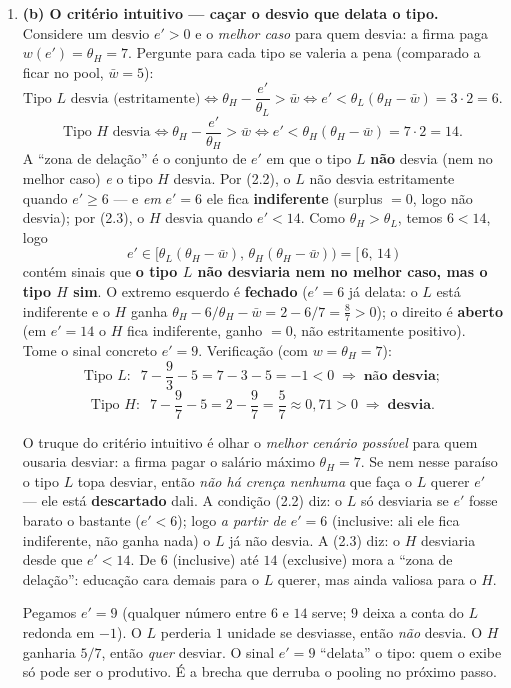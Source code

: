 \documentclass[11pt,a4paper]{article}
\newcommand{\dc}[2]{#1{,}#2}
\begin{document}
\begin{enumerate}[leftmargin=2em,itemsep=4pt]
\item \textbf{(b) O critério intuitivo — caçar o desvio que delata o tipo.} Considere um
desvio $e'>0$ e o \emph{melhor caso} para quem desvia: a firma paga $w(e')=\theta_H=7$. Pergunte
para cada tipo se valeria a pena (comparado a ficar no pool, $\bar w=5$):
\[
\text{Tipo }L\text{ desvia (estritamente)} \iff \theta_H-\frac{e'}{\theta_L}>\bar w
\iff e' < \theta_L(\theta_H-\bar w) = 3\cdot 2 = 6. \tag{2.2}
\]
\[
\text{Tipo }H\text{ desvia} \iff \theta_H-\frac{e'}{\theta_H}>\bar w
\iff e' < \theta_H(\theta_H-\bar w) = 7\cdot 2 = 14. \tag{2.3}
\]
A ``zona de delação'' é o conjunto de $e'$ em que o tipo $L$ \textbf{não} desvia (nem no
melhor caso) \emph{e} o tipo $H$ desvia. Por (2.2), o $L$ não desvia estritamente quando
$e'\ge 6$ — e \emph{em} $e'=6$ ele fica \textbf{indiferente} (surplus $=0$, logo não desvia);
por (2.3), o $H$ desvia quando $e'<14$. Como $\theta_H>\theta_L$, temos $6<14$, logo
\[
\boxed{\;e'\in\big[\theta_L(\theta_H-\bar w),\,\theta_H(\theta_H-\bar w)\big)=[\,6,\,14\,)\;} \tag{2.4}
\]
contém sinais que \textbf{o tipo $L$ não desviaria nem no melhor caso, mas o tipo $H$ sim}.
O extremo esquerdo é \textbf{fechado} ($e'=6$ já delata: o $L$ está indiferente e o $H$ ganha
$\theta_H-6/\theta_H-\bar w=2-6/7=\tfrac{8}{7}>0$); o direito é \textbf{aberto} (em $e'=14$ o
$H$ fica indiferente, ganho $=0$, não estritamente positivo).
Tome o sinal concreto $\boxed{e'=9}$. Verificação (com $w=\theta_H=7$):
\[
\text{Tipo }L: \;\; 7-\frac{9}{3}-5 = 7-3-5 = -1 < 0 \;\Rightarrow\; \textbf{não desvia};
\]
\[
\text{Tipo }H: \;\; 7-\frac{9}{7}-5 = 2-\frac{9}{7} = \frac{5}{7}\approx\dc{0}{71} > 0
\;\Rightarrow\; \textbf{desvia}.
\]

\begin{empalavras}[Por que ``mesmo no melhor caso'' e como ler o $[6,14)$]
O truque do critério intuitivo é olhar o \emph{melhor cenário possível} para quem ousaria
desviar: a firma pagar o salário máximo $\theta_H=7$. Se nem nesse paraíso o tipo $L$ topa
desviar, então \emph{não há crença nenhuma} que faça o $L$ querer $e'$ — ele está
\textbf{descartado} dali. A condição (2.2) diz: o $L$ só desviaria se $e'$ fosse barato o
bastante ($e'<6$); logo \emph{a partir de} $e'=6$ (inclusive: ali ele fica indiferente, não
ganha nada) o $L$ já não desvia. A (2.3) diz: o $H$ desviaria desde que $e'<14$. De $6$
(inclusive) até $14$ (exclusive) mora a ``zona de delação'': educação cara demais para o $L$
querer, mas ainda valiosa para o $H$.

\smallskip\noindent
Pegamos $e'=9$ (qualquer número entre $6$ e $14$ serve; $9$ deixa a conta do $L$ redonda em
$-1$). O $L$ perderia $1$ unidade se desviasse, então \emph{não} desvia. O $H$ ganharia $5/7$,
então \emph{quer} desviar. O sinal $e'=9$ ``delata'' o tipo: quem o exibe só pode ser o
produtivo. É a brecha que derruba o pooling no próximo passo.
\end{empalavras}


\end{enumerate}
\end{document}
